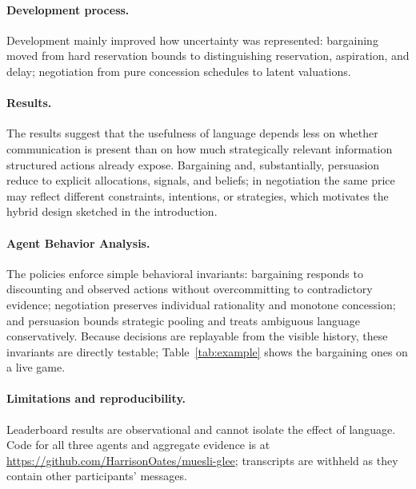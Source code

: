 \documentclass{article}
\newcommand{\repourl}{\url{https://github.com/HarrisonOates/muesli-glee}}
\begin{document}
\paragraph{Development process.}
Development mainly improved how uncertainty was represented: bargaining moved from hard reservation bounds to distinguishing reservation, aspiration, and delay; negotiation from pure concession schedules to latent valuations.

\paragraph{Results.}
The results suggest that the usefulness of language depends less on whether communication is present than on how much strategically relevant information structured actions already expose.
Bargaining and, substantially, persuasion reduce to explicit allocations, signals, and beliefs; in negotiation the same price may reflect different constraints, intentions, or strategies, which motivates the hybrid design sketched in the introduction.

\paragraph{Agent Behavior Analysis.}
The policies enforce simple behavioral invariants: bargaining responds to discounting and observed actions without overcommitting to contradictory evidence; negotiation preserves individual rationality and monotone concession; and persuasion bounds strategic pooling and treats ambiguous language conservatively.
Because decisions are replayable from the visible history, these invariants are directly testable; Table~\ref{tab:example} shows the bargaining ones on a live game.


\paragraph{Limitations and reproducibility.}
Leaderboard results are observational and cannot isolate the effect of language.
Code for all three agents and aggregate evidence is at \repourl{}; transcripts are withheld as they contain other participants' messages.




\end{document}
